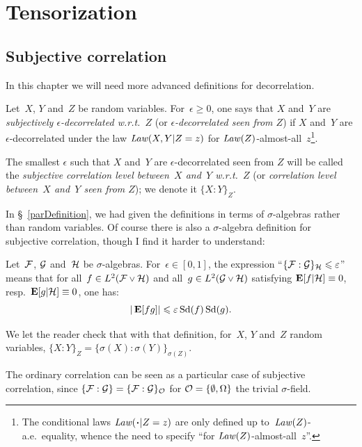 \chapter{Tensorization}\label{parTensorization}%

\section{Subjective correlation}\label{parSubjectiveCorrelation}

In this chapter we will need more advanced definitions for decorrelation.

\begin{Def}
Let~$X$, $Y$ and~$Z$ be random variables. For~$\epsilon\geq 0$,
one says that $X$ and~$Y$ are \emph{subjectively $\epsilon$-decorrelated w.r.t.~$Z$}
(or \emph{$\epsilon$-decorrelated seen from $Z$})
if $X$ and~$Y$ are $\epsilon$-decorrelated under the law $\operatorname{\mathit{Law}}(X,Y|{Z=z})$
for $\operatorname{\mathit{Law}}(Z)$-almost-all~$z$\footnote{The conditional laws $\Law(\Bcdot|{Z=z})$
are only defined up to~$\operatorname{\mathit{Law}}(Z)$-a.e.\ equality, whence the need to specify
``for $\operatorname{\mathit{Law}}(Z)$-almost-all~$z$''.}.

The smallest $\epsilon$ such that $X$ and~$Y$ are $\epsilon$-decorrelated
seen from $Z$ will be called the \emph{subjective correlation level
between~$X$ and~$Y$ w.r.t.~$Z$} (or \emph{correlation level between~$X$ and~$Y$ seen from $Z$});
we denote it ${\{X:Y\}}_{Z}$.
\end{Def}

In \S~\ref{parDefinition}, we had given the definitions
in terms of $\sigma$-algebras rather than random variables.
Of course there is also a $\sigma$-algebra definition for subjective correlation,
though I find it harder to understand:
%
\begin{Def}\label{def5436}
Let~$\mathcal{F}$, $\mathcal{G}$ and~$\mathcal{H}$ be $\sigma$-algebras.
For~$\epsilon \in [0,1]$, the expression
``$\{\mathcal{F}:\mathcal{G}\}_{\mathcal{H}} \leqslant \varepsilon$'' means that
for all~$f \in \ldb(\mcal{F}\vee\mcal{H})$ and all~$g \in \ldb(\mcal{G}\vee\mcal{H})$
satisfying $\mathop{\smash{\mathbf{E}}}\nolimits[f|\mathcal{H}] \equiv 0$, resp.\ $\mathop{\smash{\mathbf{E}}}\nolimits[g|\mathcal{H}] \equiv 0$,
one has:
\[ |\mathop{\smash{\mathbf{E}}}\nolimits[fg]| \leqslant \varepsilon \operatorname{Sd}(f) \operatorname{Sd}(g) .\]
\end{Def}

We let the reader check that with that definition,
for~$X$, $Y$ and~$Z$ random variables,
${\{X:Y\}}_{Z} = \{\sigma(X):\sigma(Y)\}_{\sigma(Z)}$.

\begin{Rmk}
The ordinary correlation can be seen as a particular case of subjective correlation,
since $\{\mathcal{F}:\mathcal{G}\} = \{\mathcal{F}:\mathcal{G}\}_{\mathcal{O}}$ for $\mathcal{O} = \{\emptyset,\Omega\}$
the trivial $\sigma$-field.
\end{Rmk}


